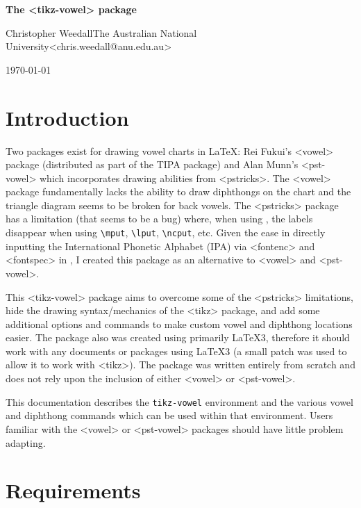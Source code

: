 \documentclass{article}
\newcommand{\pkg}[1]{\texttt{#1}}
\def\\{}%
\def\texttt#1{<#1>}%
\begin{document}
\begin{center}
{\Large\bfseries The \pkg{tikz-vowel} package}
\vspace{.5in}

\large Christopher Weedall\\The Australian National University\\\texttt{chris.weedall@anu.edu.au}

\bigskip
\today
\end{center}

\section{Introduction}

Two packages exist for drawing vowel charts in \LaTeX: Rei Fukui's \pkg{vowel} package (distributed as part of the TIPA package) and Alan Munn's \pkg{pst-vowel} which incorporates drawing abilities from \pkg{pstricks}.  The \pkg{vowel} package fundamentally lacks the ability to draw diphthongs on the chart and the triangle diagram seems to be broken for back vowels.  The \pkg{pstricks} package has a limitation (that seems to be a bug) where, when using \XeLaTeX, the labels disappear when using \verb|\mput|, \verb|\lput|, \verb|\ncput|, etc.  Given the ease in directly inputting the International Phonetic Alphabet (IPA) via \pkg{fontenc} and \pkg{fontspec} in \XeLaTeX, I created this package as an alternative to \pkg{vowel} and \pkg{pst-vowel}.

This \pkg{tikz-vowel} package aims to overcome some of the \pkg{pstricks} limitations, hide the drawing syntax/mechanics of the \pkg{tikz} package, and add some additional options and commands to make custom vowel and diphthong locations easier.  The package also was created using primarily \LaTeX3, therefore it should work with any documents or packages using \LaTeX3 (a small patch was used to allow it to work with \pkg{tikz}).  The package was written entirely from scratch and does not rely upon the inclusion of either \pkg{vowel} or \pkg{pst-vowel}.

This documentation describes the \verb|tikz-vowel| environment and the various vowel and diphthong commands which can be used within that environment.  Users familiar with the \pkg{vowel} or \pkg{pst-vowel} packages should have little problem adapting.


\tableofcontents

\section{Requirements}
\label{sec:Requirements}
\end{document}
